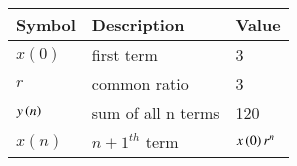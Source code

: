 \begin{tabular}{ | m{1.0cm} | m{3cm} |m{1cm} |} 
  \hline
 Symbol &Description& Value \\ 
 \hline
$x(0)$&first term& 3  \\
\hline
$r$&common ratio & 3  \\
\hline
$y\left(n\right)$& sum of all n terms&120 \\
\hline
$x(n)$&${n+1}^{th}$ term& $ x \left(0\right)r^{n}$\\
\hline
\end{tabular}\\
\caption{}
\label{Table:1}
